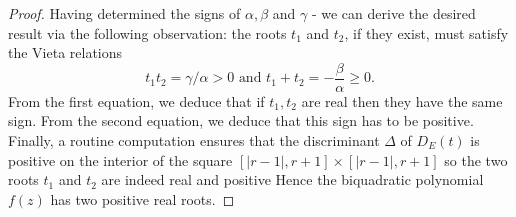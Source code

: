 \documentclass[10pt,a4paper]{amsart}
\begin{document}
\begin{proof}
Having determined the signs of $\alpha,\beta$ and $\gamma$ - we can derive the desired result via the following observation: the roots $t_1$ and $t_2$, if they exist, must satisfy the Vieta relations $$t_1t_2 = \gamma/\alpha > 0 \text{ and } t_1 + t_2 = -\frac{\beta}{\alpha} \geq 0.$$ From the first equation, we deduce that if $t_1, t_2$ are real then they have the same sign. From the second equation, we deduce that this sign has to be positive. Finally, a routine computation ensures that the discriminant $\Delta$ of $D_E(t)$ is 
positive on the interior of the square $[|r-1|, r+1] \times [|r-1|, r+1]$ so
the two roots $t_1$ and $t_2$ are indeed real and positive Hence the biquadratic polynomial $f(z)$ has two positive real roots.    
   
\end{proof}
\end{document}
